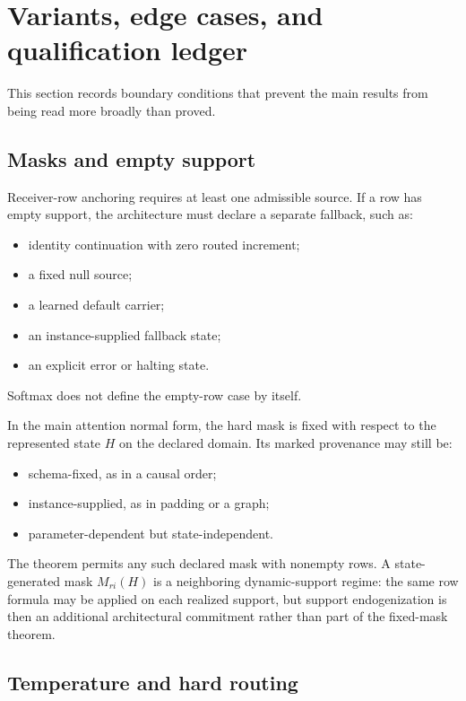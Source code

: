 \section{Variants, edge cases, and qualification ledger}\label{supp:variants}

This section records boundary conditions that prevent the main results from being read more broadly than proved.

\subsection{Masks and empty support}

Receiver-row anchoring requires at least one admissible source. If a row has empty support, the architecture must declare a separate fallback, such as:
\begin{itemize}
\item identity continuation with zero routed increment;
\item a fixed null source;
\item a learned default carrier;
\item an instance-supplied fallback state;
\item an explicit error or halting state.
\end{itemize}
Softmax does not define the empty-row case by itself.

In the main attention normal form, the hard mask is fixed with respect to the represented state $H$ on the declared domain. Its marked provenance may still be:
\begin{itemize}
\item schema-fixed, as in a causal order;
\item instance-supplied, as in padding or a graph;
\item parameter-dependent but state-independent.
\end{itemize}
The theorem permits any such declared mask with nonempty rows. A state-generated mask $M_{ri}(H)$ is a neighboring dynamic-support regime: the same row formula may be applied on each realized support, but support endogenization is then an additional architectural commitment rather than part of the fixed-mask theorem.

\subsection{Temperature and hard routing}

